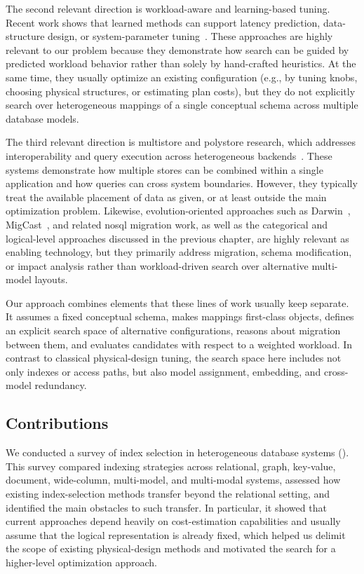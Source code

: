 The second relevant direction is workload-aware and learning-based tuning. Recent work shows that learned methods can support latency prediction, data-structure design, or system-parameter tuning~\citep{10.14778/3342263.3342646, 10.1145/3183713.3199671,10.1155/2023/8835111,10.1007/s10844-022-00762-0}. These approaches are highly relevant to our problem because they demonstrate how search can be guided by predicted workload behavior rather than solely by hand-crafted heuristics. At the same time, they usually optimize an existing configuration (e.g., by tuning knobs, choosing physical structures, or estimating plan costs), but they do not explicitly search over heterogeneous mappings of a single conceptual schema across multiple database models.

The third relevant direction is multistore and polystore research, which addresses interoperability and query execution across heterogeneous backends~\citep{alotaibi2020estocada, DBLP:journals/ijcc/BondiombouyV16, 10.1145/3417990.3421999}. These systems demonstrate how multiple stores can be combined within a single application and how queries can cross system boundaries. However, they typically treat the available placement of data as given, or at least outside the main optimization problem. Likewise, evolution-oriented approaches such as Darwin~\citep{storl2022darwin}, MigCast~\citep{hillenbrand2019migcast}, and related \acrshort{nosql} migration work, as well as the categorical and logical-level approaches discussed in the previous chapter, are highly relevant as enabling technology, but they primarily address migration, schema modification, or impact analysis rather than workload-driven search over alternative multi-model layouts.

Our approach combines elements that these lines of work usually keep separate. It assumes a fixed conceptual schema, makes mappings first-class objects, defines an explicit search space of alternative configurations, reasons about migration between them, and evaluates candidates with respect to a weighted workload. In contrast to classical physical-design tuning, the search space here includes not only indexes or access paths, but also model assignment, embedding, and cross-model redundancy.

\subsection{Contributions}

We conducted a survey of index selection in heterogeneous database systems (). This survey compared indexing strategies across relational, graph, key-value, document, wide-column, multi-model, and multi-modal systems, assessed how existing index-selection methods transfer beyond the relational setting, and identified the main obstacles to such transfer. In particular, it showed that current approaches depend heavily on cost-estimation capabilities and usually assume that the logical representation is already fixed, which helped us delimit the scope of existing physical-design methods and motivated the search for a higher-level optimization approach.

